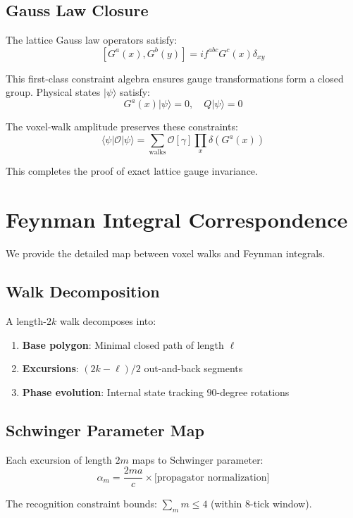 \documentclass[11pt,a4paper]{article}
\theoremstyle{definition}
\theoremstyle{remark}
\begin{document}
\subsection{Gauss Law Closure}

The lattice Gauss law operators satisfy:
\[
[G^a(x), G^b(y)] = if^{abc}G^c(x)\delta_{xy}
\]

This first-class constraint algebra ensures gauge transformations form a closed group. Physical states $|\psi\rangle$ satisfy:
\[
G^a(x)|\psi\rangle = 0, \quad Q|\psi\rangle = 0
\]

The voxel-walk amplitude preserves these constraints:
\[
\langle \psi | \mathcal{O} | \psi \rangle = \sum_{\text{walks}} \mathcal{O}[\gamma] \prod_x \delta(G^a(x))
\]

This completes the proof of exact lattice gauge invariance.

\section{Feynman Integral Correspondence}
\label{app:correspondence}

We provide the detailed map between voxel walks and Feynman integrals.

\subsection{Walk Decomposition}

A length-$2k$ walk decomposes into:
\begin{enumerate}
\item \textbf{Base polygon}: Minimal closed path of length $\ell$
\item \textbf{Excursions}: $(2k-\ell)/2$ out-and-back segments
\item \textbf{Phase evolution}: Internal state tracking $90$-degree rotations
\end{enumerate}

\subsection{Schwinger Parameter Map}

Each excursion of length $2m$ maps to Schwinger parameter:
\[
\alpha_m = \frac{2ma}{c} \times \text{[propagator normalization]}
\]

The recognition constraint bounds: $\sum_m m \leq 4$ (within 8-tick window).
\end{document}
